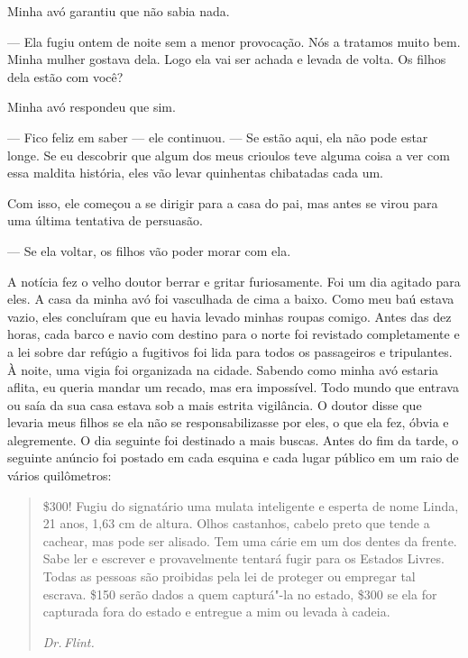 Minha avó garantiu que não sabia nada.

--- Ela fugiu ontem de noite sem a menor provocação. Nós a tratamos
muito bem. Minha mulher gostava dela. Logo ela vai ser achada e levada
de volta. Os filhos dela estão com você?

Minha avó respondeu que sim.

--- Fico feliz em saber --- ele continuou. --- Se estão aqui, ela não
pode estar longe. Se eu descobrir que algum dos meus crioulos teve
alguma coisa a ver com essa maldita história, eles vão levar quinhentas
chibatadas cada um.

Com isso, ele começou a se dirigir para a casa do pai, mas antes se
virou para uma última tentativa de persuasão.

--- Se ela voltar, os filhos vão poder morar com ela.

A notícia fez o velho doutor berrar e
gritar furiosamente. Foi um dia agitado para eles. A casa da minha avó
foi vasculhada de cima a baixo. Como meu baú estava vazio, eles
concluíram que eu havia levado minhas roupas comigo. Antes das dez
horas, cada barco e navio com destino para o norte foi revistado
completamente e a lei sobre dar refúgio a fugitivos foi lida para todos
os passageiros e tripulantes. À noite, uma vigia foi organizada na
cidade. Sabendo como minha avó estaria aflita, eu queria mandar um
recado, mas era impossível. Todo mundo que entrava ou saía da sua casa
estava sob a mais estrita vigilância. O doutor disse que levaria meus
filhos se ela não se responsabilizasse por eles, o que ela fez, óbvia e
alegremente. O dia seguinte foi destinado a mais buscas. Antes do fim da
tarde, o seguinte anúncio foi postado em cada esquina e cada lugar
público em um raio de vários quilômetros:

\begin{quote}
 \$300! Fugiu do signatário
uma mulata inteligente e esperta de nome Linda, 21 anos, 1,63 cm de
altura. Olhos castanhos, cabelo preto que tende a cachear, mas pode ser
alisado. Tem uma cárie em um dos dentes da frente. Sabe ler e escrever e
provavelmente tentará fugir para os Estados Livres. Todas as pessoas são
proibidas pela lei de proteger ou empregar tal escrava. \$150 serão
dados a quem capturá"-la no estado, \$300 se ela for capturada fora do
estado e entregue a mim ou levada à cadeia.

\hfill{}\emph{Dr.\,Flint.} \enlargethispage{\baselineskip} 
\end{quote}

